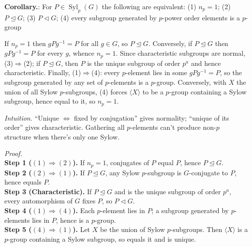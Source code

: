 \documentclass[12pt]{article}
\theoremstyle{definition}
\newcommand{\Syl}{\operatorname{Syl}}
\begin{document}
\newpage


\noindent\textbf{Corollary.}: For $P\in\Syl_p(G)$ the following are equivalent: (1) $n_p=1$; (2) $P\trianglelefteq G$; (3) $P\triangleleft G$; (4) every subgroup generated by $p$-power order elements is a $p$-group

\newpage

If $n_p=1$ then $gPg^{-1}=P$ for all $g\in G$, so $P\trianglelefteq G$. Conversely, if $P\trianglelefteq G$ then $gPg^{-1}=P$ for every $g$, whence $n_p=1$. Since characteristic subgroups are normal, (3)$\Rightarrow$(2); if $P\trianglelefteq G$, then $P$ is the unique subgroup of order $p^a$ and hence characteristic. Finally, (1)$\Rightarrow$(4): every $p$-element lies in some $gPg^{-1}=P$, so the subgroup generated by any set of $p$-elements is a $p$-group. Conversely, with $X$ the union of all Sylow $p$-subgroups, (4) forces $\langle X\rangle$ to be a $p$-group containing a Sylow subgroup, hence equal to it, so $n_p=1$.\\

\dotfill

\emph{Intuition.} “Unique $\Leftrightarrow$ fixed by conjugation” gives normality; “unique of its order” gives characteristic. Gathering all $p$-elements can’t produce non-$p$ structure when there’s only one Sylow.

\dotfill

\emph{Proof.}\\
\textbf{Step 1 ($(1)\Rightarrow(2)$).} If $n_p=1$, conjugates of $P$ equal $P$, hence $P\trianglelefteq G$.\\
\textbf{Step 2 ($(2)\Rightarrow(1)$).} If $P\trianglelefteq G$, any Sylow $p$-subgroup is $G$-conjugate to $P$, hence equals $P$.\\
\textbf{Step 3 (Characteristic).} If $P\trianglelefteq G$ and is the unique subgroup of order $p^a$, every automorphism of $G$ fixes $P$, so $P\triangleleft G$.\\
\textbf{Step 4 ($(1)\Rightarrow(4)$).} Each $p$-element lies in $P$; a subgroup generated by $p$-elements lies in $P$, hence is a $p$-group.\\
\textbf{Step 5 ($(4)\Rightarrow(1)$).} Let $X$ be the union of Sylow $p$-subgroups. Then $\langle X\rangle$ is a $p$-group containing a Sylow subgroup, so equals it and is unique.\\

\newpage
\end{document}
